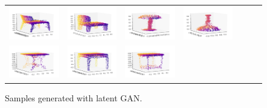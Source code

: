 \documentclass[12pt]{article}
\begin{document}
    \begin{figure}
        \centering
        \begin{tabular}{lllllll}
            \includegraphics[width = 30mm]{chair_latent_gen_1} &
            \includegraphics[width = 30mm]{chair_latent_gen_2} &
            \includegraphics[width = 30mm]{lamp_latent_gen_1} &
            \includegraphics[width = 30mm]{lamp_latent_gen_2} \\
            \includegraphics[width = 30mm]{table_latent_gen_1} &
            \includegraphics[width = 30mm]{table_latent_gen_2} &
            \includegraphics[width = 30mm]{table_latent_gen_4} \\
        \end{tabular}
        \caption{Samples generated with latent GAN.}
        \label{figure:samples_generated_with_latent_gan}
    \end{figure}
\end{document}

